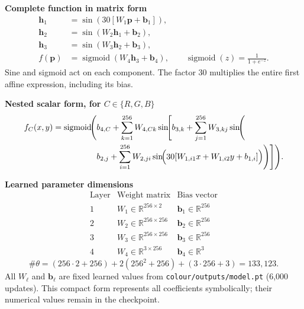 \documentclass[11pt,a4paper]{article}
\newcommand{\sigmoid}{\operatorname{sigmoid}}
\begin{document}
\vspace{5pt}
{\bfseries\color{accent}Complete function in matrix form}
\[
\boxed{\begin{aligned}
\mathbf h_1&=\sin\!\left(30\left[W_1\mathbf p+\mathbf b_1\right]\right),\\
\mathbf h_2&=\sin\!\left(W_2\mathbf h_1+\mathbf b_2\right),\\
\mathbf h_3&=\sin\!\left(W_3\mathbf h_2+\mathbf b_3\right),\\
f(\mathbf p)&=\sigmoid\!\left(W_4\mathbf h_3+\mathbf b_4\right),
\qquad \sigmoid(z)=\frac{1}{1+e^{-z}}.
\end{aligned}}
\]
{\small Sine and sigmoid act on each component. The factor $30$ multiplies the
entire first affine expression, including its bias.}

\vspace{5pt}
{\bfseries\color{accent}Nested scalar form, for $C\in\{R,G,B\}$}
\[
\begin{aligned}
f_C(x,y)=\sigmoid\!\Biggl(&b_{4,C}
+\sum_{k=1}^{256}W_{4,Ck}\sin\!\Biggl[b_{3,k}
+\sum_{j=1}^{256}W_{3,kj}\sin\!\Biggl(\\[-1pt]
&b_{2,j}+\sum_{i=1}^{256}W_{2,ji}
\sin\!\Bigl(30[W_{1,i1}x+W_{1,i2}y+b_{1,i}]\Bigr)
\Biggr)\Biggr]\Biggr).
\end{aligned}
\]

\vspace{5pt}
{\bfseries\color{accent}Learned parameter dimensions}
\[
\begin{array}{c|c|c}
\text{Layer}&\text{Weight matrix}&\text{Bias vector}\\ \hline
1&W_1\in\mathbb R^{256\times2}&\mathbf b_1\in\mathbb R^{256}\\
2&W_2\in\mathbb R^{256\times256}&\mathbf b_2\in\mathbb R^{256}\\
3&W_3\in\mathbb R^{256\times256}&\mathbf b_3\in\mathbb R^{256}\\
4&W_4\in\mathbb R^{3\times256}&\mathbf b_4\in\mathbb R^{3}
\end{array}
\]
\[
\#\theta=(256\cdot2+256)
+2(256^2+256)+(3\cdot256+3)=133{,}123.
\]
{\small All $W_\ell$ and $\mathbf b_\ell$ are fixed learned values from
\texttt{colour/outputs/model.pt} (6,000 updates). This compact form represents
all coefficients symbolically; their numerical values remain in the checkpoint.}
\end{document}
